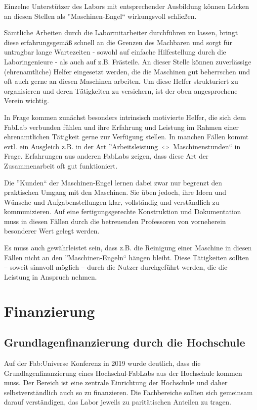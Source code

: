 \documentclass[parskip=half,headsepline,footsepline,titlepage]{scrartcl}
\begin{document}
Einzelne Unterstützer des Labors mit entsprechender Ausbildung können Lücken an diesen Stellen als ''Maschinen-Engel`` wirkungsvoll schließen.

Sämtliche Arbeiten durch die Labormitarbeiter durchführen zu lassen, bringt diese erfahrungsgemäß schnell an die Grenzen des Machbaren und sorgt für untragbar lange Wartezeiten - sowohl auf einfache Hilfestellung durch die Laboringenieure - als auch auf z.B. Frästeile. An dieser Stelle können zuverlässige (ehrenamtliche) Helfer eingesetzt werden, die die Maschinen gut beherrschen und oft auch gerne an diesen Maschinen arbeiten. Um diese Helfer strukturiert zu organisieren und deren Tätigkeiten zu versichern, ist der oben angesprochene Verein wichtig.

In Frage kommen zunächst besonders intrinsisch motivierte Helfer, die sich dem FabLab verbunden fühlen und ihre Erfahrung und Leistung im Rahmen einer ehrenamtlichen Tätigkeit gerne zur Verfügung stellen. In manchen Fällen kommt evtl. ein Ausgleich z.B. in der Art ''Arbeitsleistung $\Leftrightarrow$ Maschinenstunden`` in Frage.
Erfahrungen aus anderen FabLabs zeigen, dass diese Art der Zusammenarbeit oft gut funktioniert.

Die ''Kunden`` der Maschinen-Engel lernen dabei zwar nur begrenzt den praktischen Umgang mit den Maschinen. Sie üben jedoch, ihre Ideen und Wünsche und Aufgabenstellungen klar, vollständig und verständlich zu kommunizieren. Auf eine fertigungsgerechte Konstruktion und Dokumentation muss in diesen Fällen durch die betreuenden Professoren von vorneherein besonderer Wert gelegt werden.

Es muss auch gewährleistet sein, dass z.B. die Reinigung einer Maschine in diesen Fällen nicht an den ''Maschinen-Engeln`` hängen bleibt. Diese Tätigkeiten sollten -- soweit sinnvoll möglich -- durch die Nutzer durchgeführt werden, die die Leistung in Anspruch nehmen.


\section{Finanzierung}

\subsection{Grundlagenfinanzierung durch die Hochschule}
Auf der Fab:Universe Konferenz in 2019 wurde deutlich, dass die Grundlagenfinanzierung eines Hochschul-FabLabs aus der Hochschule kommen muss. Der Bereich ist eine zentrale Einrichtung der Hochschule und daher selbstverständlich auch so zu finanzieren. Die Fachbereiche sollten sich gemeinsam darauf verständigen, das Labor jeweils zu paritätischen Anteilen zu tragen.
\end{document}
